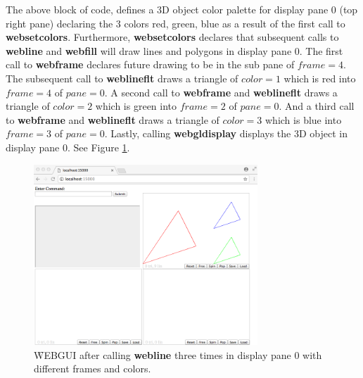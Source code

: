 The above block of code, defines a 3D object color palette for display pane 0 (top right pane) declaring the 3 colors red, green, blue as a result of the first call to 
\textbf{websetcolors}. Furthermore, \textbf{websetcolors} declares that subsequent calls to \textbf{webline} and \textbf{webfill} will draw lines and polygons 
in display pane 0. The first call to \textbf{webframe} declares future drawing to be in the sub pane of $frame=4$. The subsequent call to \textbf{weblineflt} draws a 
triangle of $color=1$ which is red into $frame=4$ of $pane=0$. A second call to \textbf{webframe} and \textbf{weblineflt} draws a triangle of  $color=2$ 
which is green into $frame=2$ of $pane=0$. And a third call to  \textbf{webframe} and \textbf{weblineflt} draws a triangle of $color=3$ which is blue into 
$frame=3$ of $pane=0$. Lastly, calling \textbf{webgldisplay} displays the 3D object in display pane 0. See Figure \ref{fig:8}.

\begin{figure}[H]
\centering
\includegraphics[width=0.75\textwidth]{pix/lines.png}
\caption{\f{WEBGUI} after calling \textbf{webline} three times in display pane 0 with different frames and colors.}
\label{fig:8}
\end{figure} 

